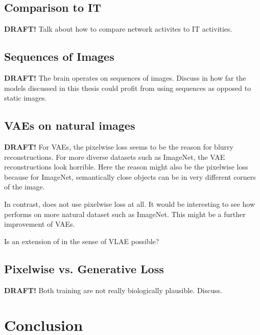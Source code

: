 \documentclass[11pt]{article}
\begin{document}
\subsection{Comparison to \ac{IT}}
\textbf{DRAFT!}
Talk about how to compare network activites to IT activities.

\subsection{Sequences of Images}
\textbf{DRAFT!}
The brain operates on sequences of images.
Discuss in how far the models discussed in this thesis could profit from using sequences as opposed to static images.

\subsection{\acp{VAE} on natural images}
\textbf{DRAFT!}
For \acp{VAE}, the pixelwise loss seems to be the reason for blurry reconstructions.
For more diverse datasets such as ImageNet, the VAE reconstructions look horrible.
Here the reason might also be the pixelwise loss because for ImageNet, semantically close objects can be in very different corners of the image.

In contrast, \citet{pidhorskyi2020adversarial} does not use pixelwise loss at all.
It would be interesting to see how \citet{pidhorskyi2020adversarial} performs on more natural dataset such as ImageNet.
This might be a further improvement of \acp{VAE}.

Is an extension of \citet{pidhorskyi2020adversarial} in the sense of VLAE possible?

\subsection{Pixelwise vs. Generative Loss}
\textbf{DRAFT!}
Both training are not really biologically plausible. Discuss.

\section{Conclusion}\label{sec:conclusion}

\newpage
\printbibliography

\newpage
\appendix
\end{document}
